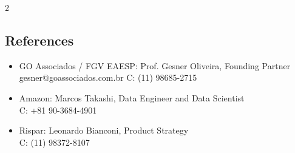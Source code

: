 \documentclass{article}
\begin{document}
\begin{multicols}{2}
\subsection{References}
\begin{itemize}
\item{GO Associados / FGV EAESP: Prof. Gesner Oliveira, Founding Partner\\gesner@goassociados.com.br C: (11) 98685-2715}
\item{Amazon: Marcos Takashi, Data Engineer and Data Scientist \\C: +81 90-3684-4901}
\item{Rispar: Leonardo Bianconi, Product Strategy \\C: (11) 98372-8107}
\end{itemize}

\end{multicols}
\end{document}
